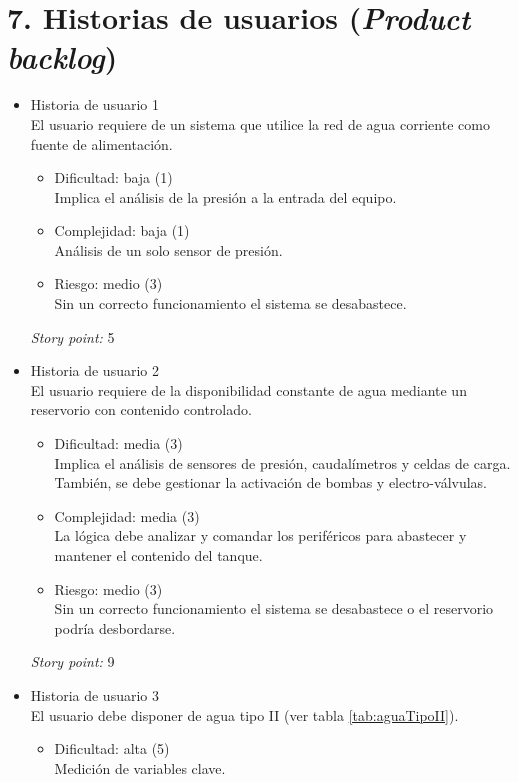 \documentclass[
11pt, %
]{charter}
\begin{document}
\section{7. Historias de usuarios (\textit{Product backlog})}
\label{sec:backlog}

\begin{itemize}
\item Historia de usuario 1
\\El usuario requiere de un sistema que utilice la red de agua corriente como fuente de alimentación.
	\begin{itemize}
		\item Dificultad: baja (1)
		\\Implica el análisis de la presión a la entrada del equipo.
		\item Complejidad: baja (1)
		\\Análisis de un solo sensor de presión.
		\item Riesgo: medio (3)
		\\Sin un correcto funcionamiento el sistema se desabastece.
	\end{itemize}
\textit{Story point:} 5
\item Historia de usuario 2
\\El usuario requiere de la disponibilidad constante de agua mediante un reservorio con contenido controlado.
	\begin{itemize}
		\item Dificultad: media (3)
		\\Implica el análisis de sensores de presión, caudalímetros y celdas de carga. También, se debe gestionar la activación de bombas y electro-válvulas.
		\item Complejidad: media (3)
		\\La lógica debe analizar y comandar los periféricos para abastecer y mantener el contenido del tanque.
		\item Riesgo: medio (3)
		\\Sin un correcto funcionamiento el sistema se desabastece o el reservorio podría desbordarse.
	\end{itemize}
\textit{Story point:} 9
\item  Historia de usuario 3
\\El usuario debe disponer de agua tipo II (ver tabla \ref{tab:aguaTipoII}).
	\begin{itemize}
		\item Dificultad: alta (5)
		\\Medición de variables clave. 

\end{itemize}
\end{itemize}
\end{document}
